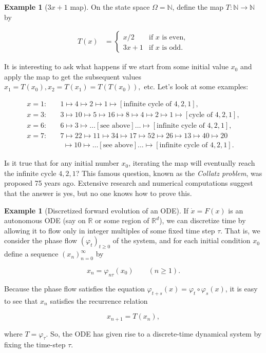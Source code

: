 \documentclass[11pt]{report}
\theoremstyle{plain}
\theoremstyle{definition}
\newtheorem{example}[thm]{Example}
\begin{document}
\begin{example}[$3x+1$ map]
On the state space $\Omega=\mathbb{N}$, define the map
$T:\mathbb{N}\to\mathbb{N}$ by

\begin{align*}
T(x) &= \begin{cases} x/2 & \textrm{if $x$ is even}, \\ 3x+1 & \textrm{if $x$ is odd}.
\end{cases}
\end{align*}

\noindent It is interesting to ask what happens if we start from
some initial value $x_0$ and apply the map to get the
subsequent values $x_1=T(x_0), x_2=T(x_1)=T(T(x_0)),$
etc. Let's look at some examples:

\begin{align*}
x=1: \quad & 1\mapsto 4 \mapsto 2 \mapsto 1 \mapsto [\textrm{infinite cycle of }4,2,1], \\
x=3: \quad & 3\mapsto 10\mapsto 5\mapsto 16\mapsto 8 \mapsto 4 \mapsto2\mapsto 1 \mapsto
[\textrm{cycle of }4,2,1], \\
x=6: \quad & 6 \mapsto 3 \mapsto \ldots[\textrm{see above}] \ldots \mapsto [\textrm{infinite cycle of }4,2,1], \\
x=7: \quad & 7 \mapsto 22\mapsto 11\mapsto 34\mapsto 17\mapsto 52\mapsto 26\mapsto13\mapsto40
\mapsto20 \\ & \ \,\mapsto10\mapsto \ldots[\textrm{see above}] \ldots \mapsto [\textrm{infinite cycle of }4,2,1].
\end{align*}

\noindent Is it true that for any initial number $x_0$,
iterating the map will eventually reach the infinite
cycle $4,2,1$? This famous question, known as the
\emph{Collatz problem}, was proposed 75 years ago.
Extensive research and numerical computations suggest
that the answer is yes, but no one knows how to prove
this.
\end{example}

\begin{example}[Discretized forward evolution of an ODE]
If $\dot{x}=F(x)$ is an autonomous ODE (say on
$\mathbb{R}$ or some region of $\mathbb{R}^d$), we can
discretize time by allowing it to flow only in integer
multiples of some fixed time step $\tau$. That is, we
consider the phase flow $(\varphi_t)_{t\ge 0}$ of the
system, and for each initial condition $x_0$ define a
sequence $(x_n)_{n=0}^\infty$ by

\[
x_n = \varphi_{n\tau}(x_0) \qquad (n\ge 1).
\]

\noindent Because the phase flow satisfies the equation
$\varphi_{t+s}(x)=\varphi_t\circ \varphi_s(x)$, it is
easy to see that $x_n$ satisfies the recurrence
relation

\[
x_{n+1} = T(x_n),
\]

\noindent where $T = \varphi_\tau$. So, the ODE has given rise
to a discrete-time dynamical system by fixing the
time-step $\tau$.
\end{example}
\end{document}
